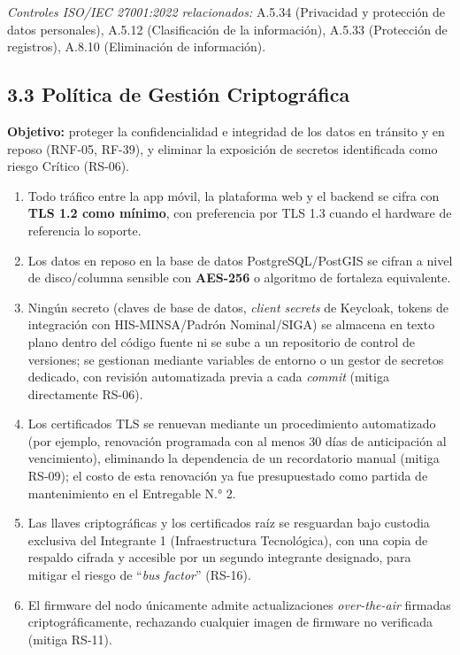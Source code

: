 \documentclass[11pt,a4paper]{article}
\providecommand{\tightlist}{%
  \setlength{\itemsep}{0pt}\setlength{\parskip}{0pt}}
\begin{document}
\emph{Controles ISO/IEC 27001:2022 relacionados:} A.5.34 (Privacidad y protección de datos personales), A.5.12 (Clasificación de la información), A.5.33 (Protección de registros), A.8.10 (Eliminación de información).

\subsection{3.3 Política de Gestión Criptográfica}\label{poluxedtica-de-gestiuxf3n-criptogruxe1fica}

\textbf{Objetivo:} proteger la confidencialidad e integridad de los datos en tránsito y en reposo (RNF-05, RF-39), y eliminar la exposición de secretos identificada como riesgo Crítico (RS-06).

\begin{enumerate}
\def\labelenumi{\arabic{enumi}.}
\tightlist
\item
  Todo tráfico entre la app móvil, la plataforma web y el backend se cifra con \textbf{TLS 1.2 como mínimo}, con preferencia por TLS 1.3 cuando el hardware de referencia lo soporte.
\item
  Los datos en reposo en la base de datos PostgreSQL/PostGIS se cifran a nivel de disco/columna sensible con \textbf{AES-256} o algoritmo de fortaleza equivalente.
\item
  Ningún secreto (claves de base de datos, \emph{client secrets} de Keycloak, tokens de integración con HIS-MINSA/Padrón Nominal/SIGA) se almacena en texto plano dentro del código fuente ni se sube a un repositorio de control de versiones; se gestionan mediante variables de entorno o un gestor de secretos dedicado, con revisión automatizada previa a cada \emph{commit} (mitiga directamente RS-06).
\item
  Los certificados TLS se renuevan mediante un procedimiento automatizado (por ejemplo, renovación programada con al menos 30 días de anticipación al vencimiento), eliminando la dependencia de un recordatorio manual (mitiga RS-09); el costo de esta renovación ya fue presupuestado como partida de mantenimiento en el Entregable N.° 2.
\item
  Las llaves criptográficas y los certificados raíz se resguardan bajo custodia exclusiva del Integrante 1 (Infraestructura Tecnológica), con una copia de respaldo cifrada y accesible por un segundo integrante designado, para mitigar el riesgo de ``\emph{bus factor}'' (RS-16).
\item
  El firmware del nodo únicamente admite actualizaciones \emph{over-the-air} firmadas criptográficamente, rechazando cualquier imagen de firmware no verificada (mitiga RS-11).
\end{enumerate}
\end{document}
